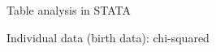 \documentclass[compress, notes=hide]{beamer}
\begin{document}
\begin{frame}[fragile]{Table analysis in STATA}
\begin{block}{Individual data (birth data): chi-squared}
	
	\begin{figure}[H]
		\begin{center}
			{}
		\end{center}
	\end{figure}
	
\end{block}
\end{frame}
\end{document}
